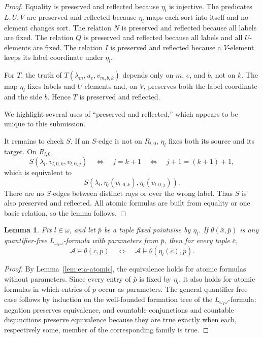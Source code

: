 \documentclass[12pt]{article}
\newtheorem{lemma}[theorem]{Lemma}
\theoremstyle{definition}
\theoremstyle{remark}
\newcommand{\review}[1]{\begin{reviewbox}#1\end{reviewbox}}
\begin{document}
\begin{proof}
Equality is preserved and reflected because \(\eta_l\) is injective.  The predicates \(L,U,V\) are preserved and reflected because \(\eta_l\) maps each sort into itself and no element changes sort.  The relation \(N\) is preserved and reflected because all labels are fixed.  The relation \(Q\) is preserved and reflected because all labels and all \(U\)-elements are fixed.  The relation \(I\) is preserved and reflected because a \(V\)-element keeps its label coordinate under \(\eta_l\).

For \(T\), the truth of \(T(\lambda_m,u_e,v_{m,b,k})\) depends only on \(m\), \(e\), and \(b\), not on \(k\).  The map \(\eta_l\) fixes labels and \(U\)-elements and, on \(V\), preserves both the label coordinate and the side \(b\).  Hence \(T\) is preserved and reflected.

\review{We highlight several uses of ``preserved and reflected,'' which appears to be unique to this submission.}

It remains to check \(S\).  If an \(S\)-edge is not on \(R_{l,0}\), \(\eta_l\) fixes both its source and its target.  On \(R_{l,0}\),
\[
S(\lambda_l,v_{l,0,k},v_{l,0,j})
\quad\Longleftrightarrow\quad
j=k+1
\quad\Longleftrightarrow\quad
j+1=(k+1)+1,
\]
which is equivalent to
\[
S(\lambda_l,\eta_l(v_{l,0,k}),\eta_l(v_{l,0,j})).
\]
There are no \(S\)-edges between distinct rays or over the wrong label.  Thus \(S\) is also preserved and reflected.  All atomic formulas are built from equality or one basic relation, so the lemma follows.
\end{proof}

\begin{lemma}\label{lem:eta-qf}
Fix \(l\in\omega\), and let \(\bar p\) be a tuple fixed pointwise by \(\eta_l\).  If \(\theta(\bar x,\bar p)\) is any quantifier-free \(L_{\omega_1\omega}\)-formula with parameters from \(\bar p\), then for every tuple \(\bar c\),
\[
\mathcal A\models \theta(\bar c,\bar p)
\quad\Longleftrightarrow\quad
\mathcal A\models \theta(\eta_l(\bar c),\bar p).
\]
\end{lemma}

\begin{proof}
By Lemma~\ref{lem:eta-atomic}, the equivalence holds for atomic formulas without parameters.  Since every entry of \(\bar p\) is fixed by \(\eta_l\), it also holds for atomic formulas in which entries of \(\bar p\) occur as parameters.  The general quantifier-free case follows by induction on the well-founded formation tree of the \(L_{\omega_1\omega}\)-formula: negation preserves equivalence, and countable conjunctions and countable disjunctions preserve equivalence because they are true exactly when each, respectively some, member of the corresponding family is true.
\end{proof}
\end{document}
